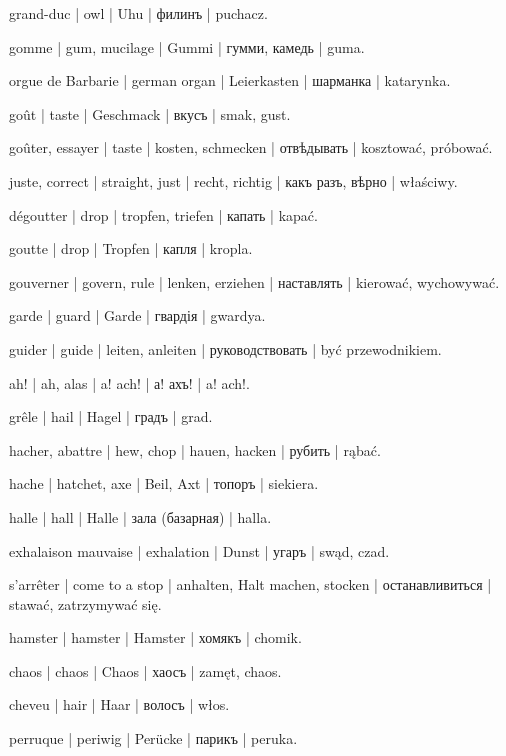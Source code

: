 \begin{outdent}{1em}
grand-duc | owl | Uhu | филинъ | puchacz.

gomme | gum, mucilage | Gummi | гумми, камедь | guma.

orgue de Barbarie | german organ | Leierkasten | шарманка | katarynka.

goût | taste | Geschmack | вкусъ | smak, gust.

\uvsubentry{}
goûter, essayer | taste | kosten, schmecken | отвѣдывать | kosztować, próbować.

juste, correct | straight, just | recht, richtig | какъ разъ,
вѣрно | właściwy.

dégoutter | drop | tropfen, triefen | капать | kapać.

\uvsubentry{}
goutte | drop | Tropfen | капля | kropla.

gouverner | govern, rule | lenken, erziehen | наставлять | kierować, wychowywać.

garde | guard | Garde | гвардія | gwardya.

guider | guide | leiten, anleiten | руководствовать | być
przewodnikiem.


ah! | ah, alas | a! ach! | а! ахъ! | a! ach!.

grêle | hail | Hagel | градъ | grad.

hacher, abattre | hew, chop | hauen, hacken | рубить | rąbać.

\uvsubentry{}
hache | hatchet, axe | Beil, Axt | топоръ | siekiera.

halle | hall | Halle | зала (базарная) | halla.

exhalaison mauvaise | exhalation | Dunst | угаръ | swąd, czad.

s’arrêter | come to a stop | anhalten, Halt machen, stocken | останавливиться | stawać, zatrzymywać się.

hamster | hamster | Hamster | хомякъ | chomik.

chaos | chaos | Chaos | хаосъ | zamęt, chaos.

cheveu | hair | Haar | волосъ | włos.

\uvsubentry{}
perruque | periwig | Perücke | парикъ | peruka.



\end{outdent}
